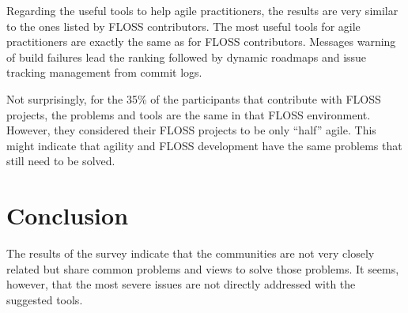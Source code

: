\documentclass[lnbip]{svmultln}
\begin{document}
Regarding the useful tools to help agile practitioners, the results
are very similar to the ones listed by FLOSS contributors. The most
useful tools for agile practitioners are exactly the same as for FLOSS
contributors. Messages warning of build failures lead the ranking
followed by dynamic roadmaps and issue tracking management from commit
logs.

Not surprisingly, for the 35\% of the participants that contribute
with FLOSS projects, the problems and tools are the same in that FLOSS
environment. However, they considered their FLOSS projects to be only
``half'' agile. This might indicate that agility and FLOSS development
have the same problems that still need to be solved.

\section{Conclusion}
\label{sec:conclusion}

The results of the survey indicate that the communities are not very
closely related but share common problems and views to solve those
problems. It seems, however, that the most severe issues are not
directly addressed with the suggested tools.


\end{document}
